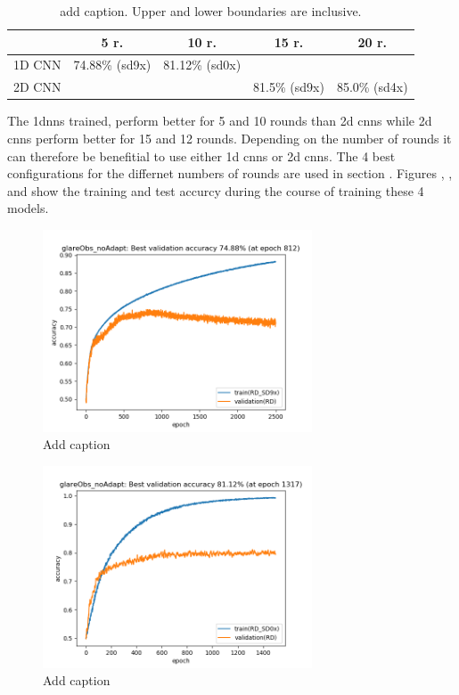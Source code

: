 \begin{table}[H]
	\centering
	\caption{add caption. Upper and lower boundaries are inclusive.}%
		\begin{tabular}{|l||c|c|c|c|}
			\hline
			& 5 r. & 10 r. & 15 r. & 20 r.  \\
			\hline
			\hline
			1D CNN & 74.88\% (sd9x) & 81.12\% (sd0x) & &  \\
			\hline
			2D CNN &  & & 81.5\% (sd9x) & 85.0\% (sd4x)  \\
			\hline
		\end{tabular}
\end{table}

The 1dnns trained, perform better for 5 and 10 rounds than 2d cnns while 2d cnns perform better for 15 and 12 rounds. Depending on the number of rounds it can therefore be benefitial to use either 1d cnns or 2d cnns. The 4 best configurations for the differnet numbers of rounds are used in section . Figures , ,  and  show the training and test accurcy during the course of training these 4 models. 

\begin{minipage}{0.5\textwidth}
	\begin{figure}[H]
		\centering
		\includegraphics[width=8cm]{images/bestHistories/1d_10s_sd9x_acc.png}
		\caption[Bild kurz]{Add caption}
		\label{fig:1d10}
	\end{figure}
\end{minipage}
\begin{minipage}{0.5\textwidth}
	\begin{figure}[H]
		\centering
		\includegraphics[width=8cm]{images/bestHistories/1d_20s_sd0x_acc.png}
		\caption[Bild kurz]{Add caption}
		\label{fig:1d20}
	\end{figure}
\end{minipage}

